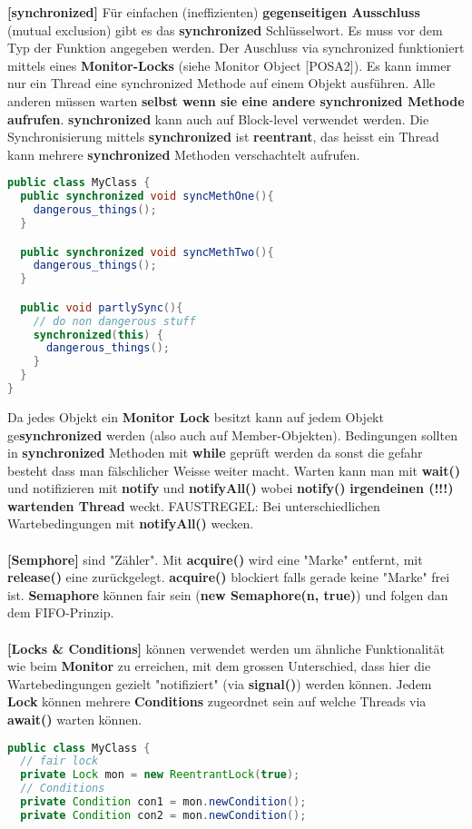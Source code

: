 \documentclass[8pt]{extarticle}
\let\oldtextbf\textbf
\renewcommand{\textbf}{\tiny\oldtextbf}
\begin{document}
\begin{multicols*}{5}
\textbf{[synchronized]} Für einfachen (ineffizienten) \textbf{gegenseitigen Ausschluss} (mutual exclusion) gibt es das \textbf{synchronized} Schlüsselwort. Es muss vor dem Typ der Funktion angegeben werden. Der Auschluss via synchronized funktioniert mittels eines \textbf{Monitor-Locks} (siehe Monitor Object [POSA2]). Es kann immer nur ein Thread eine synchronized Methode auf einem Objekt ausführen. Alle anderen müssen warten \textbf{selbst wenn sie eine andere synchronized Methode aufrufen}. \textbf{synchronized} kann auch auf Block-level verwendet werden. Die Synchronisierung mittels \textbf{synchronized} ist \textbf{reentrant}, das heisst ein Thread kann mehrere \textbf{synchronized} Methoden verschachtelt aufrufen.
\begin{lstlisting}[language=java]
public class MyClass {
  public synchronized void syncMethOne(){
    dangerous_things();
  }

  public synchronized void syncMethTwo(){
    dangerous_things();
  }

  public void partlySync(){
    // do non dangerous stuff
    synchronized(this) {
      dangerous_things();
    }
  }
}
\end{lstlisting}
Da jedes Objekt ein \textbf{Monitor Lock} besitzt kann auf jedem Objekt ge\textbf{synchronized} werden (also auch auf Member-Objekten). Bedingungen sollten in \textbf{synchronized} Methoden mit \textbf{while} geprüft werden da sonst die gefahr besteht dass man fälschlicher Weisse weiter macht. Warten kann man mit \textbf{wait()} und notifizieren mit \textbf{notify} und \textbf{notifyAll()} wobei \textbf{notify()} \textbf{irgendeinen (!!!) wartenden Thread} weckt. FAUSTREGEL: Bei unterschiedlichen Wartebedingungen mit \textbf{notifyAll()} wecken.\\\\
\textbf{[Semphore]} sind "Zähler". Mit \textbf{acquire()} wird eine "Marke" entfernt, mit \textbf{release()} eine zurückgelegt. \textbf{acquire()} blockiert falls gerade keine "Marke" frei ist. \textbf{Semaphore} können fair sein (\textbf{new Semaphore(n, true)}) und folgen dan dem FIFO-Prinzip.\\\\
\textbf{[Locks \& Conditions]} können verwendet werden um ähnliche Funktionalität wie beim \textbf{Monitor} zu erreichen, mit dem grossen Unterschied, dass hier die Wartebedingungen gezielt "notifiziert" (via \textbf{signal()}) werden können. Jedem \textbf{Lock} können mehrere \textbf{Conditions} zugeordnet sein auf welche Threads via \textbf{await()} warten können.
\begin{lstlisting}[language=java]
public class MyClass {
  // fair lock
  private Lock mon = new ReentrantLock(true);
  // Conditions
  private Condition con1 = mon.newCondition();
  private Condition con2 = mon.newCondition();


\end{lstlisting}
\end{multicols*}
\end{document}
